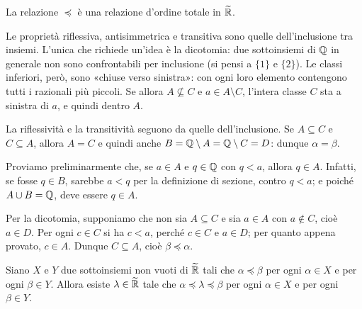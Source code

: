 \begin{proposizione}\label{prop:ordine-modello}
La relazione $\preceq$ è una relazione d'ordine totale in $\widetilde{\mathbb{R}}$.
\end{proposizione}

\begin{schema}
\end{schema}

\begin{strategia}
Le proprietà riflessiva, antisimmetrica e transitiva sono quelle dell'inclusione tra
insiemi. L'unica che richiede un'idea è la dicotomia: due sottoinsiemi di $\mathbb{Q}$ in
generale non sono confrontabili per inclusione (si pensi a $\{1\}$ e $\{2\}$). Le classi
inferiori, però, sono «chiuse verso sinistra»: con ogni loro elemento contengono tutti i
razionali più piccoli. Se allora $A\not\subseteq C$ e $a\in A\setminus C$, l'intera
classe $C$ sta a sinistra di $a$, e quindi dentro $A$.
\end{strategia}

\begin{dimostrazione}
La riflessività e la transitività seguono da quelle dell'inclusione. Se $A\subseteq C$ e
$C\subseteq A$, allora $A=C$ e quindi anche $B=\mathbb{Q}\setminus A=\mathbb{Q}\setminus C=D$: dunque
$\alpha=\beta$.

Proviamo preliminarmente che, se $a\in A$ e $q\in\mathbb{Q}$ con $q<a$, allora $q\in A$.
Infatti, se fosse $q\in B$, sarebbe $a<q$ per la definizione di sezione, contro $q<a$; e
poiché $A\cup B=\mathbb{Q}$, deve essere $q\in A$.

Per la dicotomia, supponiamo che non sia $A\subseteq C$ e sia $a\in A$ con $a\notin C$,
cioè $a\in D$. Per ogni $c\in C$ si ha $c<a$, perché $c\in C$ e $a\in D$; per quanto
appena provato, $c\in A$. Dunque $C\subseteq A$, cioè $\beta\preceq\alpha$.
\end{dimostrazione}

\begin{teorema}\label{teo:completezza-modello}
Siano $X$ e $Y$ due sottoinsiemi non vuoti di $\widetilde{\mathbb{R}}$ tali che
$\alpha\preceq\beta$ per ogni $\alpha\in X$ e per ogni $\beta\in Y$. Allora esiste
$\lambda\in\widetilde{\mathbb{R}}$ tale che $\alpha\preceq\lambda\preceq\beta$ per ogni
$\alpha\in X$ e per ogni $\beta\in Y$.
\end{teorema}

